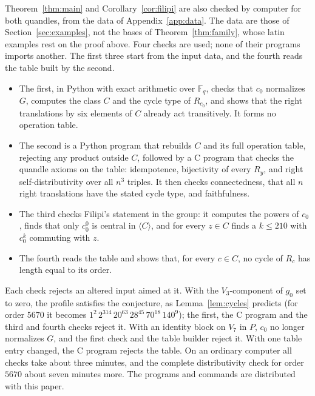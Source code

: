 \documentclass[11pt]{article}
\newcommand{\F}{\mathbb{F}}
\begin{document}
Theorem~\ref{thm:main} and Corollary~\ref{cor:filipi} are also checked by
computer for both quandles, from the data of Appendix~\ref{app:data}. The
data are those of Section~\ref{sec:examples}, not the bases of
Theorem~\ref{thm:family}, whose latin examples rest on the proof above.
Four checks are used; none of their programs imports another. The first
three start from the input data, and the fourth reads the table built by
the second.
\begin{itemize}
\item The first, in Python with exact arithmetic over $\F_q$, checks that
$c_0$ normalizes $G$, computes the class $C$ and the cycle type of
$R_{c_0}$, and shows that the right translations by six elements of $C$
already act transitively. It forms no operation table.
\item The second is a Python program that rebuilds $C$ and its full
operation table, rejecting any product outside $C$, followed by a C program
that checks the quandle axioms on the table: idempotence, bijectivity of
every $R_y$, and right self-distributivity over all $n^3$ triples. It then
checks connectedness, that all $n$ right translations have the stated cycle
type, and faithfulness.
\item The third checks Filipi's statement in the group: it computes the
powers of $c_0$, finds that only $c_0^0$ is central in $\langle C\rangle$,
and for every $z\in C$ finds a $k\le210$ with $c_0^k$ commuting with $z$.
\item The fourth reads the table and shows that, for every $c\in C$, no
cycle of $R_c$ has length equal to its order.
\end{itemize}
Each check rejects an altered input aimed at it. With the $V_3$-component of
$g_0$ set to zero, the profile satisfies the conjecture, as
Lemma~\ref{lem:cycles} predicts (for order $5670$ it becomes
$1^2\,2^{314}\,20^{63}\,28^{45}\,70^{18}\,140^{9}$); the first, the C
program and the third and fourth checks reject it. With an identity block
on $V_7$ in $P$, $c_0$ no longer normalizes $G$, and the first check and the
table builder reject it. With one table entry changed, the C program
rejects the table. On an ordinary computer all checks take about three
minutes, and the complete distributivity check for order $5670$ about
seven minutes more. The programs and commands are distributed with this
paper.
\end{document}
